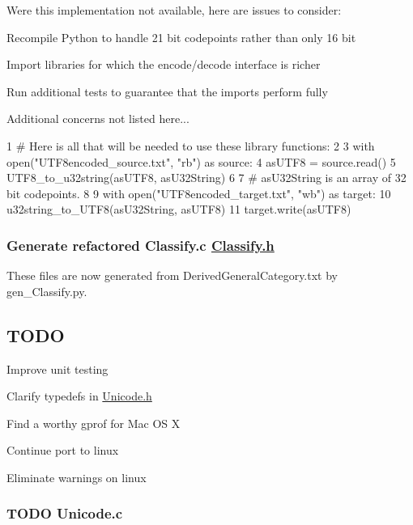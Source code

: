 Were this implementation not available, here are issues to consider\+:
\begin{DoxyItemize}
\item Recompile Python to handle 21 bit codepoints rather than only 16 bit
\item Import libraries for which the encode/decode interface is richer
\item Run additional tests to guarantee that the imports perform fully
\item Additional concerns not listed here...
\end{DoxyItemize}


\begin{DoxyCode}
1 # Here is all that will be needed to use these library functions:
2 
3 with open("UTF8encoded\_source.txt", "rb") as source:
4     asUTF8 = source.read()
5     UTF8\_to\_u32string(asUTF8, asU32String)
6 
7 # asU32String is an array of 32 bit codepoints.
8 
9 with open("UTF8encoded\_target.txt", "wb") as target:
10     u32string\_to\_UTF8(asU32String, asUTF8)
11     target.write(asUTF8)
\end{DoxyCode}


\subsubsection*{Generate refactored Classify.\+c \hyperlink{_classify_8h_source}{Classify.\+h}}

These files are now generated from Derived\+General\+Category.\+txt by gen\+\_\+\+Classify.\+py.

\subsection*{T\+O\+D\+O}


\begin{DoxyItemize}
\item Improve unit testing
\item Clarify typedefs in \hyperlink{_unicode_8h_source}{Unicode.\+h}
\item Find a worthy gprof for Mac O\+S X
\item Continue port to linux
\item Eliminate warnings on linux
\end{DoxyItemize}

\subsubsection*{T\+O\+D\+O Unicode.\+c}


